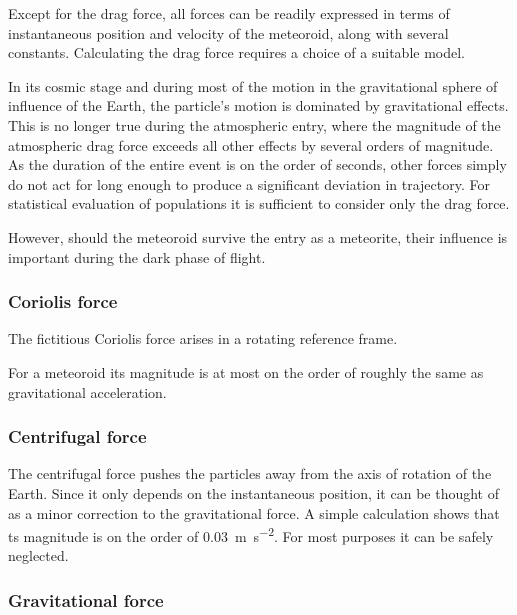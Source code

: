         Except for the drag force, all forces can be readily expressed in terms of instantaneous position and velocity of the meteoroid,
        along with several constants.
        Calculating the drag force requires a choice of a suitable model.

        In its cosmic stage and during most of the motion in the gravitational sphere of influence of the Earth,
        the particle's motion is dominated by gravitational effects. This is no longer true during the atmospheric entry,
        where the magnitude of the atmospheric drag force exceeds all other effects by several orders of magnitude.
        As the duration of the entire event is on the order of seconds, other forces simply do not act for long enough
        to produce a significant deviation in trajectory. For statistical evaluation of populations it is sufficient
        to consider only the drag force.

        However, should the meteoroid survive the entry as a meteorite, their influence is important during the dark phase of flight.

        \subsubsection{Coriolis force} \label{aafC}
            The fictitious Coriolis force arises in a rotating reference frame.

            For a meteoroid its magnitude is at most on the order of
            roughly the same as gravitational acceleration.

        \subsubsection{Centrifugal force} \label{aafc}
            The centrifugal force pushes the particles away from the axis of rotation of the Earth.
            Since it only depends on the instantaneous position, it can be thought of as a minor correction to the
            gravitational force. A simple calculation shows that ts magnitude is on the order
            of \SI{0.03}{\metre\per\second\squared}. For most purposes it can be safely neglected.

        \subsubsection{Gravitational force} \label{aafg}
            
